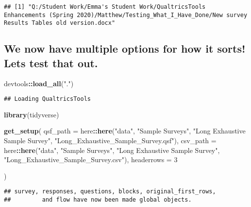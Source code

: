 \documentclass[
]{article}
\newenvironment{Shaded}{\begin{snugshade}}{\end{snugshade}}
\newcommand{\DataTypeTok}[1]{\textcolor[rgb]{0.13,0.29,0.53}{#1}}
\newcommand{\DecValTok}[1]{\textcolor[rgb]{0.00,0.00,0.81}{#1}}
\newcommand{\KeywordTok}[1]{\textcolor[rgb]{0.13,0.29,0.53}{\textbf{#1}}}
\newcommand{\NormalTok}[1]{#1}
\newcommand{\OperatorTok}[1]{\textcolor[rgb]{0.81,0.36,0.00}{\textbf{#1}}}
\newcommand{\StringTok}[1]{\textcolor[rgb]{0.31,0.60,0.02}{#1}}
\begin{document}
\begin{verbatim}
## [1] "Q:/Student Work/Emma's Student Work/QualtricsTools Enhancements (Spring 2020)/Matthew/Testing_What_I_Have_Done/New survey Results Tables old version.docx"
\end{verbatim}

\hypertarget{we-now-have-multiple-options-for-how-it-sorts-lets-test-that-out.}{%
\subsection{We now have multiple options for how it sorts! Lets test
that
out.}\label{we-now-have-multiple-options-for-how-it-sorts-lets-test-that-out.}}

\begin{Shaded}
\begin{Highlighting}[]
\NormalTok{devtools}\OperatorTok{::}\KeywordTok{load_all}\NormalTok{(}\StringTok{"."}\NormalTok{)}
\end{Highlighting}
\end{Shaded}

\begin{verbatim}
## Loading QualtricsTools
\end{verbatim}

\begin{Shaded}
\begin{Highlighting}[]
\KeywordTok{library}\NormalTok{(tidyverse)}


\KeywordTok{get_setup}\NormalTok{(}
  \DataTypeTok{qsf_path =}\NormalTok{ here}\OperatorTok{::}\KeywordTok{here}\NormalTok{(}\StringTok{"data"}\NormalTok{, }\StringTok{"Sample Surveys"}\NormalTok{, }\StringTok{"Long Exhaustive Sample Survey"}\NormalTok{, }\StringTok{"Long_Exhaustive_Sample_Survey.qsf"}\NormalTok{),}
  \DataTypeTok{csv_path =}\NormalTok{ here}\OperatorTok{::}\KeywordTok{here}\NormalTok{(}\StringTok{"data"}\NormalTok{, }\StringTok{"Sample Surveys"}\NormalTok{, }\StringTok{"Long Exhaustive Sample Survey"}\NormalTok{, }\StringTok{"Long_Exhaustive_Sample_Survey.csv"}\NormalTok{),}
  \DataTypeTok{headerrows =} \DecValTok{3}

\NormalTok{)}
\end{Highlighting}
\end{Shaded}

\begin{verbatim}
## survey, responses, questions, blocks, original_first_rows,
##         and flow have now been made global objects.
\end{verbatim}
\end{document}

